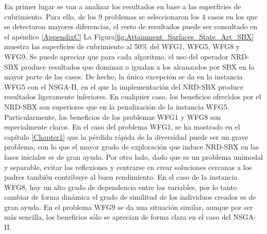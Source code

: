 En primer lugar se van a analizar los resultados en base a las superficies de cubrimiento. 
%
Para ello, de los 9 problemas se seleccionaron los 4 casos en los que se detectaron mayores diferencias, el resto de resultados puede ser consultado en el apéndice \ref{AppendixC}
%
La Figura\ref{fig:Attainment_Surfaces_State_Art_SBX} muestra las superficies de cubrimiento al 50\% del WFG1, WFG5, WFG8 y WFG9.
%
Se puede apreciar que para cada algoritmo, el uso del operador NRD-SBX produce resultados que dominan o igualan a los alcanzados por SBX en la mayor parte de las casos. 
%
De hecho, la única excepción se da en la instancia WFG5 con el NSGA-II, en el que la implementación del NRD-SBX produce resultados ligeramente inferiores.
%
En cualquier caso, los beneficios ofrecidos por el NRD-SBX son superiores que en la penalización de la instancia WFG5.
%
Particularmente, los beneficios de los problemas WFG1 y WFG8 son especialmente claros.
%
En el caso del problema WFG1, se ha mostrado en el capítulo \ref{Chapter1} que la pérdida rápida de la diversidad puede ser un grave problema, con lo que el mayor grado de exploración que induce NRD-SBX en las fases iniciales es de gran ayuda.
%
Por otro lado, dado que es un problema unimodal y separable, evitar las reflexiones y centrarse en crear soluciones cercanas a los padres también contribuye al buen rendimiento.
%
En el caso de la instancia WFG8, hay un alto grado de dependencia entre las variables, por lo tanto cambiar de forma dinámica el grado de similitud de los individuos creados es de gran ayuda.
%
En el problema WFG9 se da una situación similar, aunque por ser más sencilla, los beneficios sólo se aprecian de forma clara en el caso del NSGA-II.

